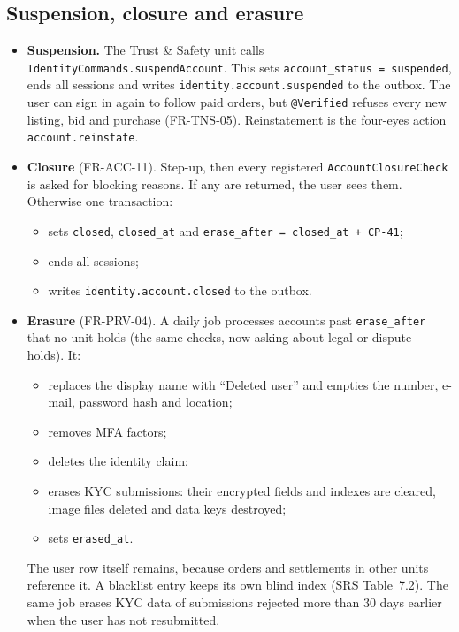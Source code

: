 \documentclass[11pt,a4paper]{article}
\begin{document}
\subsection{Suspension, closure and erasure}
\begin{itemize}[nosep]
  \item \textbf{Suspension.} The Trust \& Safety unit calls \texttt{IdentityCommands.suspendAccount}. This sets \texttt{account\_status = suspended}, ends all sessions and writes \texttt{identity.account.suspended} to the outbox. The user can sign in again to follow paid orders, but \texttt{@Verified} refuses every new listing, bid and purchase (FR-TNS-05). Reinstatement is the four-eyes action \texttt{account.reinstate}.
  \item \textbf{Closure} (FR-ACC-11). Step-up, then every registered \texttt{AccountClosureCheck} is asked for blocking reasons. If any are returned, the user sees them. Otherwise one transaction:
  \begin{itemize}[nosep]
    \item sets \texttt{closed}, \texttt{closed\_at} and \texttt{erase\_after = closed\_at + CP-41};
    \item ends all sessions;
    \item writes \texttt{identity.account.closed} to the outbox.
  \end{itemize}
  \item \textbf{Erasure} (FR-PRV-04). A daily job processes accounts past \texttt{erase\_after} that no unit holds (the same checks, now asking about legal or dispute holds). It:
  \begin{itemize}[nosep]
    \item replaces the display name with ``Deleted user'' and empties the number, e-mail, password hash and location;
    \item removes MFA factors;
    \item deletes the identity claim;
    \item erases KYC submissions: their encrypted fields and indexes are cleared, image files deleted and data keys destroyed;
    \item sets \texttt{erased\_at}.
  \end{itemize}
  The user row itself remains, because orders and settlements in other units reference it. A blacklist entry keeps its own blind index (SRS Table~7.2). The same job erases KYC data of submissions rejected more than 30 days earlier when the user has not resubmitted.
\end{itemize}
\end{document}
